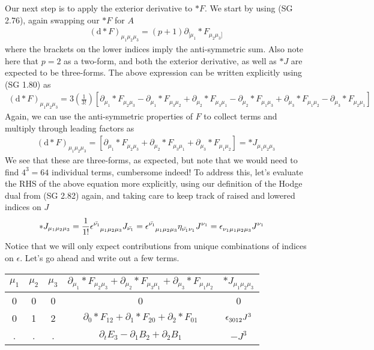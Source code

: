 Our next step is to apply the exterior derivative to $\ast F$. We start by using (SG 2.76), again swapping our $\ast F$ for $A$
%
\begin{align}
	\left(\textrm{d} \ast F\right)_{\mu_1\mu_2\mu_3} = (p+1) \partial_{[\mu_1} \ast F_{\mu_2\mu_3]}
\end{align}
%
where the brackets on the lower indices imply the anti-symmetric sum. Also note here that $p=2$ as a two-form, and both the exterior derivative, as well as $\ast J$ are expected to be three-forms. The above expression can be written explicitly using (SG 1.80) as 
%
\begin{align}
	\left(\textrm{d} \ast F\right)_{\mu_1\mu_2\mu_3} = 3 \left(\frac{1}{3!}\right) \left[ \partial_{\mu_1} \ast F_{\mu_2\mu_3} - \partial_{\mu_1} \ast F_{\mu_3\mu_2} + \partial_{\mu_2} \ast F_{\mu_3\mu_1} - \partial_{\mu_2} \ast F_{\mu_1\mu_3} + \partial_{\mu_3} \ast F_{\mu_1\mu_2} - \partial_{\mu_3} \ast F_{\mu_2\mu_1} \right]
\end{align}
%
Again, we can use the anti-symmetric properties of $F$ to collect terms and multiply through leading factors as 
%
\begin{align}
	\left(\textrm{d} \ast F\right)_{\mu_1\mu_2\mu_3} = \left[ \partial_{\mu_1} \ast F_{\mu_2\mu_3} + \partial_{\mu_2} \ast F_{\mu_3\mu_1}  + \partial_{\mu_3} \ast F_{\mu_1\mu_2} \right] = \ast J_{\mu_1\mu_2\mu_3} 
\end{align}
%
We see that these are three-forms, as expected, but note that we would need to find $4^3 = 64$ individual terms, cumbersome indeed! To address this, let's evaluate the RHS of the above equation more explicitly, using our definition of the Hodge dual from (SG 2.82) again, and taking care to keep track of raised and lowered indices on $J$
%
\begin{align}
\ast J_{\mu_1\mu_2\mu_3} &= \frac{1}{1!} \epsilon\indices{^{{\bar{\nu_1}}}_{{\mu_1}{\mu_2}{\mu_3}}} J_{\bar{\nu_1}} 
= \epsilon\indices{^{{\bar{\nu_1}}}_{{\mu_1}{\mu_2}{\mu_3}}} \eta\indices{_{\bar{\nu_1}\nu_1}} J\indices{^{\nu_1}}
= \epsilon\indices{_{{\nu_1}{\mu_1}{\mu_2}{\mu_3}}} J\indices{^{\nu_1}}
\end{align} 
%
Notice that we will only expect contributions from unique combinations of indices on $\epsilon$. Let's go ahead and write out a few terms. 
%
\begin{center}
	\begin{tabular}{| c | c | c | c | c |} 
		\hline
		$\mu_1$ & $\mu_2$ & $\mu_3$ & $\partial_{\mu_1} \ast F_{\mu_2\mu_3} + \partial_{\mu_2} \ast F_{\mu_3\mu_1} + \partial_{\mu_3} \ast F_{\mu_1\mu_2}$ & $\ast J_{\mu_1 \mu_2 \mu_3}$ \\
		\hline\hline
		0 & 0 & 0 & 0 & 0 \\ 
		0 & 1 & 2 & $\partial_{0} \ast F_{12} + \partial_{1} \ast F_{20} + \partial_{2} \ast F_{01}$ & $\epsilon\indices{_{{3}{0}{1}{2}}}J^3$\\
		. & . & . & $\partial_{t} E_3 - \partial_{1} B_2 + \partial_{2} B_1$ & $-J^3$ \\
		\hline
	\end{tabular}
\end{center}
